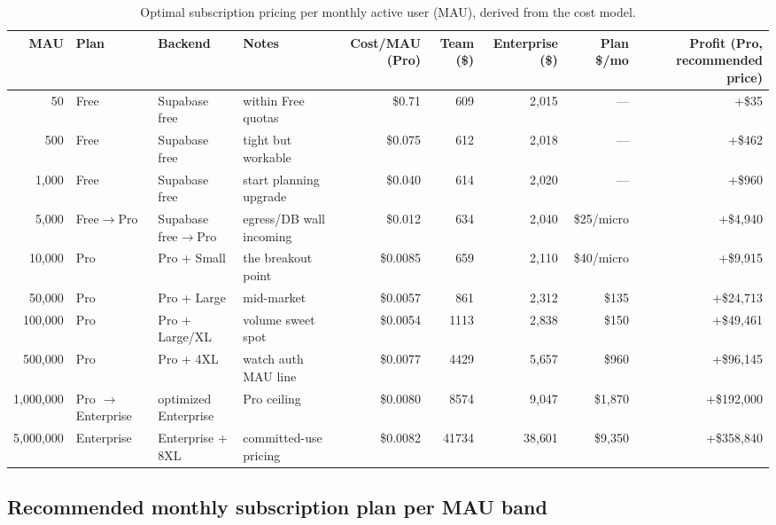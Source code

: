 \documentclass[11pt]{article}
\begin{document}
\begin{table}[H]\centering\scriptsize
\caption{Optimal subscription pricing per monthly active user (MAU), derived from the cost model.}
\begin{tabular}{r l l l r r r r r}
\toprule
\textbf{MAU} & \textbf{Plan} & \textbf{Backend} & \textbf{Notes} & \textbf{Cost/MAU (Pro)} & \textbf{Team (\$)} & \textbf{Enterprise (\$)} & \textbf{Plan \$/mo} & \textbf{Profit (Pro, recommended price)} \\
\midrule
50       & Free       & Supabase free         & within Free quotas        & \$0.71  & 609   & 2{,}015 & ---        & +\$35                     \\
500      & Free       & Supabase free         & tight but workable        & \$0.075 & 612   & 2{,}018 & ---        & +\$462                    \\
1{,}000  & Free       & Supabase free         & start planning upgrade    & \$0.040 & 614   & 2{,}020 & ---        & +\$960                    \\
5{,}000  & Free$\to$Pro & Supabase free$\to$Pro & egress/DB wall incoming & \$0.012 & 634   & 2{,}040 & \$25/micro & +\$4{,}940                 \\
10{,}000 & Pro        & Pro + Small           & the breakout point        & \$0.0085& 659   & 2{,}110 & \$40/micro & +\$9{,}915                 \\
50{,}000 & Pro        & Pro + Large           & mid-market                & \$0.0057& 861   & 2{,}312 & \$135      & +\$24{,}713                \\
100{,}000& Pro        & Pro + Large/XL        & volume sweet spot         & \$0.0054& 1113  & 2{,}838 & \$150      & +\$49{,}461                \\
500{,}000& Pro        & Pro + 4XL             & watch auth MAU line       & \$0.0077& 4429  & 5{,}657 & \$960      & +\$96{,}145                \\
1{,}000{,}000 & Pro $\to$ Enterprise & optimized Enterprise & Pro ceiling  & \$0.0080& 8574 & 9{,}047 & \$1{,}870  & +\$192{,}000               \\
5{,}000{,}000 & Enterprise & Enterprise + 8XL  & committed-use pricing      & \$0.0082& 41734 & 38{,}601 & \$9{,}350   & +\$358{,}840               \\
\bottomrule
\end{tabular}
\end{table}

\subsection{Recommended monthly subscription plan per MAU band}
\end{document}
